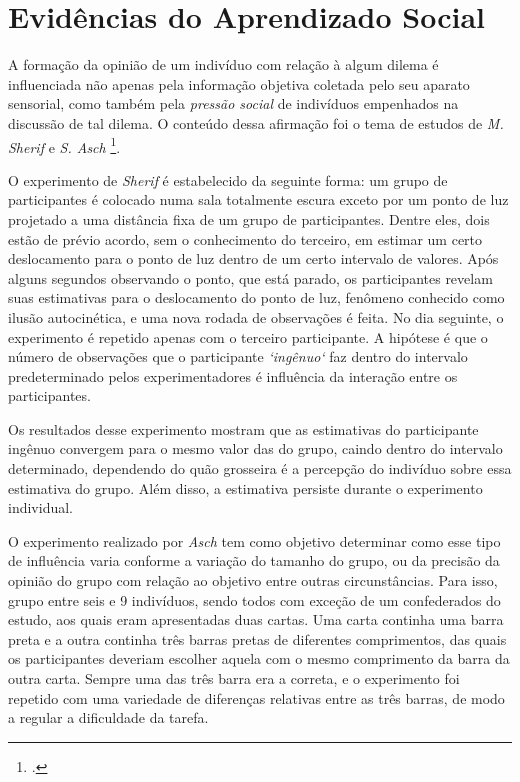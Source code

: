\section{Evidências do Aprendizado Social}

A formação da opinião de um indivíduo com relação à algum dilema é influenciada não apenas pela informação objetiva coletada \footnotemark pelo seu aparato sensorial,  como  também pela \emph{pressão social} de indivíduos empenhados na discussão de tal dilema.
O conteúdo dessa afirmação foi o tema de estudos de \emph{M. Sherif} e \emph{S. Asch} \footcite{Sherif1937, Asch1955}.

O experimento de \emph{Sherif} é estabelecido da seguinte forma: um grupo de participantes é colocado numa sala totalmente escura exceto por um ponto de luz projetado a uma distância fixa de um grupo de participantes.
Dentre eles, dois estão de prévio acordo, sem o conhecimento do terceiro, em estimar um certo deslocamento para o ponto de luz dentro de um certo intervalo de valores.
Após alguns segundos observando o ponto, que está parado, os participantes revelam suas estimativas para o deslocamento do ponto de luz, fenômeno conhecido como ilusão autocinética, e uma nova rodada de observações é feita.
No dia seguinte, o experimento é repetido apenas com o terceiro participante.
A hipótese é que o número de observações que o participante \emph{`ingênuo`} faz dentro do intervalo predeterminado pelos experimentadores é influência da interação entre os participantes.

Os resultados desse experimento mostram que as estimativas do participante ingênuo convergem para o mesmo valor das do grupo, caindo dentro do intervalo determinado, dependendo do quão grosseira é a percepção do indivíduo sobre essa estimativa do grupo.
Além disso, a estimativa persiste durante o experimento individual.

O experimento realizado por \emph{Asch} tem como objetivo determinar como esse tipo de influência varia conforme a variação do tamanho do grupo, ou da precisão da opinião do grupo com relação ao objetivo entre outras circunstâncias.
Para isso, grupo entre seis e 9 indivíduos, sendo todos com exceção de um confederados do estudo, aos quais eram apresentadas duas cartas.
Uma carta continha uma barra preta e a outra continha três barras pretas de diferentes comprimentos, das quais os participantes deveriam escolher aquela com o mesmo comprimento da barra da outra carta.
Sempre uma das três barra era a correta, e o experimento foi repetido com uma variedade de diferenças relativas entre as três barras, de modo a regular a dificuldade da tarefa.

